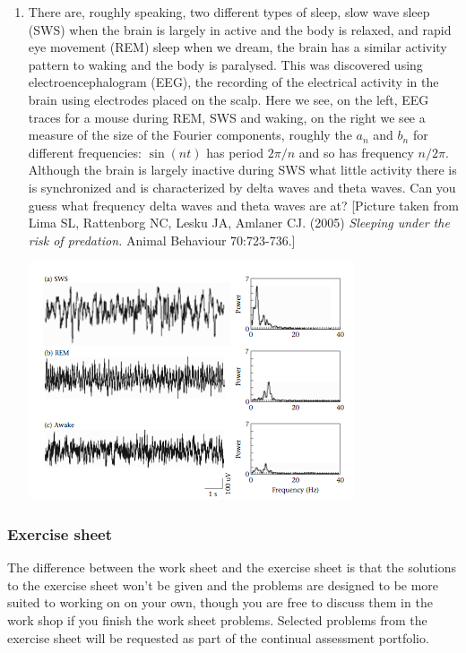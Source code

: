 \documentclass[12pt]{article}
\begin{document}
\begin{enumerate}
\item There are, roughly speaking, two different types of sleep, slow
  wave sleep (SWS) when the brain is largely in active and the body is
  relaxed, and rapid eye movement (REM) sleep when we dream, the brain
  has a similar activity pattern to waking and the body is
  paralysed. This was discovered using electroencephalogram (EEG), the
  recording of the electrical activity in the brain using electrodes
  placed on the scalp. Here we see, on the left, EEG traces for a
  mouse during REM, SWS and waking, on the right we see a measure of
  the size of the Fourier components, roughly the $a_n$ and $b_n$ for
  different frequencies: $\sin(n t)$ has period $2\pi/n$ and so has
  frequency $n/2\pi$. Although the brain is largely inactive during
  SWS what little activity there is is synchronized and is
  characterized by delta waves and theta waves. Can you guess what
  frequency delta waves and theta waves are at? [Picture taken from Lima SL, Rattenborg NC, Lesku JA, Amlaner CJ. (2005) \textsl{Sleeping under the risk of predation.} Animal Behaviour 70:723-736.]  
\begin{center}
\includegraphics{SleepGeneral.png}
\end{center}
\end{enumerate}


\subsubsection*{Exercise sheet}

The difference between the work sheet and the exercise sheet is that
the solutions to the exercise sheet won't be given and the problems
are designed to be more suited to working on on your own, though you
are free to discuss them in the work shop if you finish the work sheet
problems. Selected problems from the exercise sheet will be requested
as part of the continual assessment portfolio.
\end{document}
